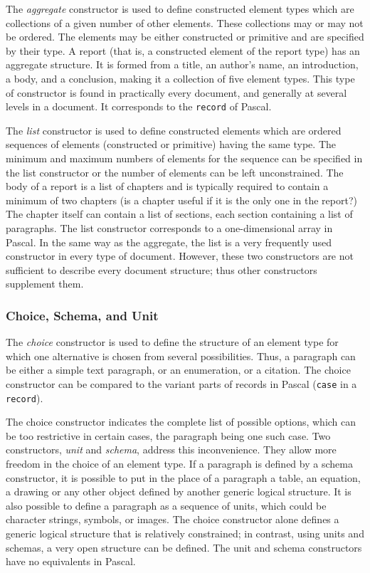 The {\em aggregate} constructor is used to define constructed element
types which are collections of a given number of other elements.
These collections may or may not be ordered.  The elements may be
either constructed or primitive and are specified by their type.  A
report (that is, a constructed element of the report type) has an
aggregate structure.  It is formed from a title, an author's name, an
introduction, a body, and a conclusion, making it a collection of five
element types.  This type of constructor is found in practically every
document, and generally at several levels in a document.  It
corresponds to the {\tt record} of Pascal.

The {\em list} constructor is used to define constructed elements
which are ordered sequences of elements (constructed or primitive)
having the same type.  The minimum and maximum numbers of elements for
the sequence can be specified in the list constructor or the number of
elements can be left unconstrained.  The body of a report is a list of
chapters and is typically required to contain a minimum of two
chapters (is a chapter useful if it is the only one in the report?)
The chapter itself can contain a list of sections, each section
containing a list of paragraphs.  The list constructor corresponds to
a one-dimensional array in Pascal.  In the same way as the aggregate,
the list is a very frequently used constructor in every type of
document.  However, these two constructors are not sufficient to
describe every document structure; thus other constructors supplement
them.

\subsubsection{Choice, Schema, and Unit}
\label{schemasandunits}

The {\em choice} constructor is used to define the structure of an
element type for which one alternative is chosen from several
possibilities.  Thus, a paragraph can be either a simple text
paragraph, or an enumeration, or a citation.  The choice constructor
can be compared to the variant parts of records in Pascal ({\tt case}
in a {\tt record}).

The choice constructor indicates the complete list of possible
options, which can be too restrictive in certain cases, the paragraph
being one such case.  Two constructors, {\em unit} and {\em schema},
address this inconvenience.  They allow more freedom in the choice of
an element type.  If a paragraph is defined by a schema constructor,
it is possible to put in the place of a paragraph a table, an
equation, a drawing or any other object defined by another generic
logical structure.  It is also possible to define a paragraph as a
sequence of units, which could be character strings, symbols, or
images.  The choice constructor alone defines a generic logical
structure that is relatively constrained; in contrast, using units and
schemas, a very open structure can be defined.  The unit and schema
constructors have no equivalents in Pascal.

